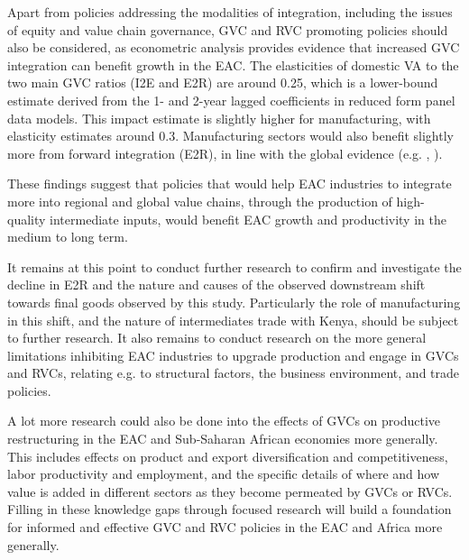 \documentclass[a4paper]{article}
\begin{document}
Apart from policies addressing the modalities of integration, including the issues of equity and value chain governance, GVC and RVC promoting policies should also be considered, as econometric analysis provides evidence that increased GVC integration can benefit growth in the EAC. The elasticities of domestic VA to the two main GVC ratios  (I2E and E2R) are around 0.25, which is a lower-bound estimate derived from the 1- and 2-year lagged coefficients in reduced form panel data models.  This impact estimate is slightly higher for manufacturing, with elasticity estimates around 0.3. Manufacturing sectors would also benefit slightly more from forward integration (E2R), in line with the global evidence (e.g.  \citet{Kummritz20161}, \citet{kummritz2015global}). \newline

These findings suggest that policies that would help EAC industries to integrate more into regional and global value chains, through the production of high-quality intermediate inputs, would benefit EAC growth and productivity in the medium to long term. \newline 

It remains at this point to conduct further research to confirm and investigate the decline in E2R and the nature and causes of the observed downstream shift towards final goods observed by this study. Particularly the role of manufacturing in this shift, and the nature of intermediates trade with Kenya, should be subject to further research. It also remains to conduct research on the more general limitations inhibiting EAC industries to upgrade production and engage in GVCs and RVCs, relating e.g. to structural factors, the business environment, and trade policies. \newline

A lot more research could also be done into the effects of GVCs on productive restructuring in the EAC and Sub-Saharan African economies more generally. This includes effects on product and export diversification and competitiveness, labor productivity and employment, and the specific details of where and how value is added in different sectors as they become permeated by GVCs or RVCs. Filling in these knowledge gaps through focused research will build a foundation for informed and effective GVC and RVC policies in the EAC and Africa more generally. \newline
\end{document}
